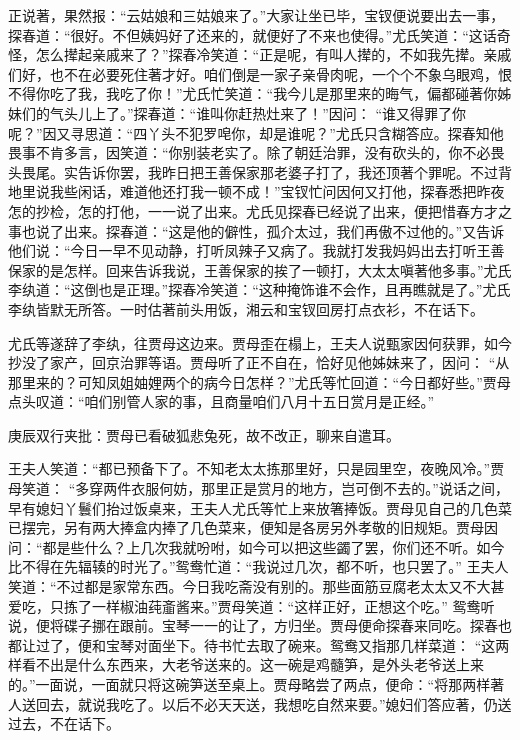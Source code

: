 \begin{parag}
    正说著，果然报：“云姑娘和三姑娘来了。”大家让坐已毕，宝钗便说要出去一事，探春道：“很好。不但姨妈好了还来的，就便好了不来也使得。”尤氏笑道：“这话奇怪，怎么撵起亲戚来了？”探春冷笑道：“正是呢，有叫人撵的，不如我先撵。亲戚们好，也不在必要死住著才好。咱们倒是一家子亲骨肉呢，一个个不象乌眼鸡，恨不得你吃了我，我吃了你！”尤氏忙笑道：“我今儿是那里来的晦气，偏都碰著你姊妹们的气头儿上了。”探春道：“谁叫你赶热灶来了！”因问： “谁又得罪了你呢？”因又寻思道：“四丫头不犯罗唣你，却是谁呢？”尤氏只含糊答应。探春知他畏事不肯多言，因笑道：“你别装老实了。除了朝廷治罪，没有砍头的，你不必畏头畏尾。实告诉你罢，我昨日把王善保家那老婆子打了，我还顶著个罪呢。不过背地里说我些闲话，难道他还打我一顿不成！”宝钗忙问因何又打他，探春悉把昨夜怎的抄检，怎的打他，一一说了出来。尤氏见探春已经说了出来，便把惜春方才之事也说了出来。探春道：“这是他的僻性，孤介太过，我们再傲不过他的。”又告诉他们说：“今日一早不见动静，打听凤辣子又病了。我就打发我妈妈出去打听王善保家的是怎样。回来告诉我说，王善保家的挨了一顿打，大太太嗔著他多事。”尤氏李纨道：“这倒也是正理。”探春冷笑道：“这种掩饰谁不会作，且再瞧就是了。”尤氏李纨皆默无所答。一时估著前头用饭，湘云和宝钗回房打点衣衫，不在话下。
\end{parag}


\begin{parag}
    尤氏等遂辞了李纨，往贾母这边来。贾母歪在榻上，王夫人说甄家因何获罪，如今抄没了家产，回京治罪等语。贾母听了正不自在，恰好见他姊妹来了，因问： “从那里来的？可知凤姐妯娌两个的病今日怎样？”尤氏等忙回道：“今日都好些。”贾母点头叹道：“咱们别管人家的事，且商量咱们八月十五日赏月是正经。”\begin{note}庚辰双行夹批：贾母已看破狐悲兔死，故不改正，聊来自遣耳。\end{note}王夫人笑道：“都已预备下了。不知老太太拣那里好，只是园里空，夜晚风冷。”贾母笑道： “多穿两件衣服何妨，那里正是赏月的地方，岂可倒不去的。”说话之间，早有媳妇丫鬟们抬过饭桌来，王夫人尤氏等忙上来放箸捧饭。贾母见自己的几色菜已摆完，另有两大捧盒内捧了几色菜来，便知是各房另外孝敬的旧规矩。贾母因问：“都是些什么？上几次我就吩咐，如今可以把这些蠲了罢，你们还不听。如今比不得在先辐辏的时光了。”鸳鸯忙道：“我说过几次，都不听，也只罢了。” 王夫人笑道：“不过都是家常东西。今日我吃斋没有别的。那些面筋豆腐老太太又不大甚爱吃，只拣了一样椒油莼齑酱来。”贾母笑道：“这样正好，正想这个吃。” 鸳鸯听说，便将碟子挪在跟前。宝琴一一的让了，方归坐。贾母便命探春来同吃。探春也都让过了，便和宝琴对面坐下。待书忙去取了碗来。鸳鸯又指那几样菜道： “这两样看不出是什么东西来，大老爷送来的。这一碗是鸡髓笋，是外头老爷送上来的。”一面说，一面就只将这碗笋送至桌上。贾母略尝了两点，便命：“将那两样著人送回去，就说我吃了。以后不必天天送，我想吃自然来要。”媳妇们答应著，仍送过去，不在话下。
\end{parag}



